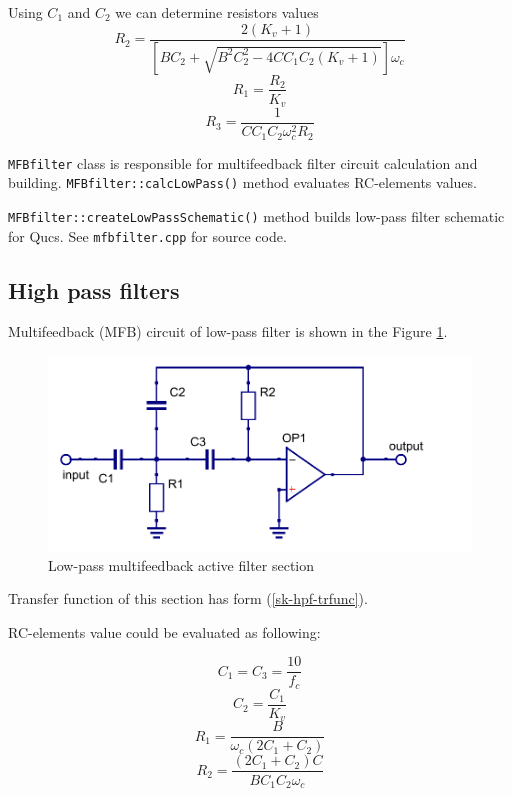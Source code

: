 Using $C_1$ and $C_2$ we can determine resistors values
\begin{equation}
 R_2=\frac{2(K_v+1)}{[BC_2+\sqrt{B^2C_2^2-4CC_1C_2(K_v+1)}]\omega_c}
\end{equation}
\begin{equation}
 R_1=\frac{R_2}{K_v}
\end{equation}
\begin{equation}
 R_3=\frac{1}{CC_1C_2\omega_c^2R_2}
\end{equation}

\verb|MFBfilter| class is responsible for multifeedback filter circuit
calculation and building. \verb|MFBfilter::calcLowPass()| method evaluates
RC-elements values. 

\verb|MFBfilter::createLowPassSchematic()| method builds
low-pass filter schematic for Qucs. See \verb|mfbfilter.cpp| for source code.




\subsection{High pass filters}

Multifeedback (MFB) circuit of low-pass filter is shown in the Figure
\ref{fig:mfb-hpf}. 

\begin{figure}[!ht]
  \centering
  \includegraphics[width=0.6\linewidth]{pics/mfb-hpf}
  \caption{Low-pass multifeedback active filter section}
  \label{fig:mfb-hpf}
\end{figure}

Transfer function of this section has form (\ref{sk-hpf-trfunc}). 

RC-elements value could be evaluated as following:

\begin{equation}
 C_1=C_3=\frac{10}{f_c}
\end{equation}
\begin{equation}
 C_2=\frac{C_1}{K_v}
\end{equation}
\begin{equation}
 R_1=\frac{B}{\omega_c(2C_1+C_2)}
\end{equation}
\begin{equation}
 R_2=\frac{(2C_1+C_2)C}{BC_1C_2\omega_c}
\end{equation}

